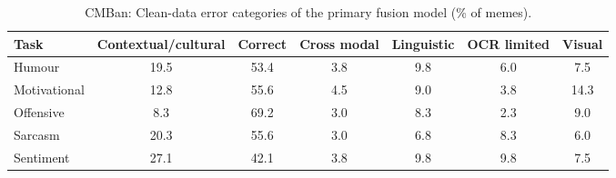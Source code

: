 \begin{table}[t]
\centering
\small
\caption{CMBan: Clean-data error categories of the primary fusion model (\% of memes).}
\label{tab:clean_error_table_cmban}
\begin{adjustbox}{max width=\columnwidth}
\begin{tabular}{lcccccc}
\toprule
Task & Contextual/cultural & Correct & Cross modal & Linguistic & OCR limited & Visual \\
\midrule
Humour & 19.5 & 53.4 & 3.8 & 9.8 & 6.0 & 7.5 \\
Motivational & 12.8 & 55.6 & 4.5 & 9.0 & 3.8 & 14.3 \\
Offensive & 8.3 & 69.2 & 3.0 & 8.3 & 2.3 & 9.0 \\
Sarcasm & 20.3 & 55.6 & 3.0 & 6.8 & 8.3 & 6.0 \\
Sentiment & 27.1 & 42.1 & 3.8 & 9.8 & 9.8 & 7.5 \\
\bottomrule
\end{tabular}
\end{adjustbox}
\end{table}
